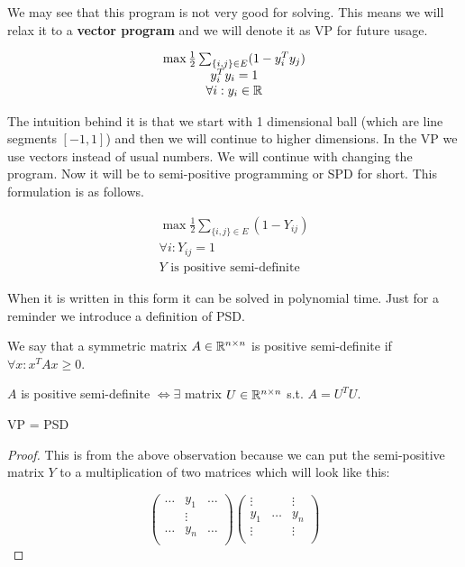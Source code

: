 We may see that this program is not very good for solving. This means we will relax it to a \textbf{vector program} and we will denote it as VP for future usage.

$$
\begin{array}{c}
	\max \frac{1}{2} \sum_{\{i,j\} \in E} (1 - y_i^T y_j) \\
	y_i^T y_i = 1 \\ 
	\forall i : y_{i} \in \mathbb{R}
\end{array}
$$

The intuition behind it is that we start with 1 dimensional ball (which are line segments $[-1,1]$) and then we will continue to higher dimensions. In the VP we use vectors instead of usual numbers. We will continue with changing the program. Now it will be to semi-positive programming or SPD for short. This formulation is as follows.

$$
\begin{array}{c}
	\max \frac{1}{2} \sum_{\{i,j\} \in E} (1 - Y_{ij}) \\
	\forall i : Y_{ij} = 1 \\
	Y \text{ is positive semi-definite}
\end{array}
$$

When it is written in this form it can be solved in polynomial time. Just for a reminder we introduce a definition of PSD.

\begin{defn}
	We say that a symmetric matrix $A \in \mathbb{R}^{n \times n}$ is positive semi-definite if $\forall x : x^T A x \geq 0$.
\end{defn}

\begin{observ}
	$A$ is positive semi-definite $\Leftrightarrow \exists$ matrix $U \in \mathbb{R}^{n \times n}$ s.t. $A = U^T U$. 
\end{observ}

\begin{observ}
	VP = PSD
\end{observ}

\begin{proof}
	This is from the above observation because we can put the semi-positive matrix $Y$ to a multiplication of two matrices which will look like this:
	
	$$
	\begin{pmatrix}
		\dots & y_1 & \dots \\
		& \vdots & \\
		\dots & y_n & \dots \\
	\end{pmatrix}
	\begin{pmatrix}
		\vdots &  & \vdots \\
		y_1 & \dots & y_n\\
		\vdots &  & \vdots \\
	\end{pmatrix}
	$$
\end{proof}

